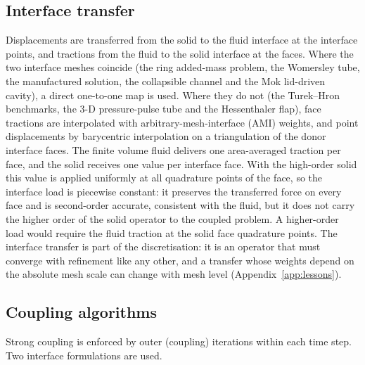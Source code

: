 \subsection{Interface transfer}\label{sec:interface_transfer}

Displacements are transferred from the solid to the fluid interface at the interface points, and tractions from the fluid to the solid interface at the faces.
Where the two interface meshes coincide (the ring added-mass problem, the Womersley tube, the manufactured solution, the collapsible channel and the Mok lid-driven cavity), a direct one-to-one map is used.
Where they do not (the Turek--Hron benchmarks, the 3-D pressure-pulse tube and the Hessenthaler flap), face tractions are interpolated with arbitrary-mesh-interface (AMI) weights, and point displacements by barycentric interpolation on a triangulation of the donor interface faces.
The finite volume fluid delivers one area-averaged traction per face, and the solid receives one value per interface face.
With the high-order solid this value is applied uniformly at all quadrature points of the face, so the interface load is piecewise constant: it preserves the transferred force on every face and is second-order accurate, consistent with the fluid, but it does not carry the higher order of the solid operator to the coupled problem.
A higher-order load would require the fluid traction at the solid face quadrature points.
The interface transfer is part of the discretisation: it is an operator that must converge with refinement like any other, and a transfer whose weights depend on the absolute mesh scale can change with mesh level (Appendix~\ref{app:lessons}).

\subsection{Coupling algorithms}\label{sec:coupling_algorithms}

Strong coupling is enforced by outer (coupling) iterations within each time step.
Two interface formulations are used.

